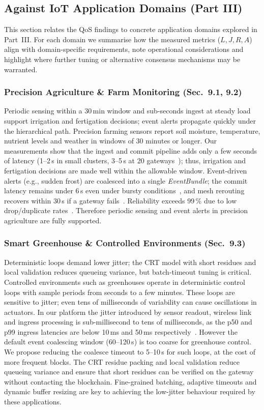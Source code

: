 \documentclass[12pt,onecolumn]{IEEEtran} %
\begin{document}
\subsection{Against IoT Application Domains (Part III)}
\label{subsec:domains}

This section relates the QoS findings to concrete application domains explored in Part~III. For each domain we summarise how the measured metrics ($L,J,R,A$) align with domain-specific requirements, note operational considerations and highlight where further tuning or alternative consensus mechanisms may be warranted.

\subsubsection{Precision Agriculture \& Farm Monitoring (Sec.~9.1, 9.2)}
Periodic sensing within a 30\,min window and sub-seconds ingest at steady load support irrigation and fertigation decisions; event alerts propagate quickly under the hierarchical path. Precision farming sensors report soil moisture, temperature, nutrient levels and weather in windows of 30 minutes or longer. Our measurements show that the ingest and commit pipeline adds only a few seconds of latency (1–2\,s in small clusters, 3–5\,s at 20 gateways~\cite{ref76853680998234}); thus, irrigation and fertigation decisions are made well within the allowable window. Event-driven alerts (e.g., sudden frost) are coalesced into a single \emph{EventBundle}; the commit latency remains under 6\,s even under bursty conditions~\cite{ref76853680998234}, and mesh rerouting recovers within 30\,s if a gateway fails~\cite{ref76853680998234}. Reliability exceeds 99\,\% due to low drop/duplicate rates~\cite{ref76853680998234}. Therefore periodic sensing and event alerts in precision agriculture are fully supported.

\subsubsection{Smart Greenhouse \& Controlled Environments (Sec.~9.3)}
Deterministic loops demand lower jitter; the CRT model with short residues and local validation reduces queueing variance, but batch-timeout tuning is critical. Controlled environments such as greenhouses operate in deterministic control loops with sample periods from seconds to a few minutes. These loops are sensitive to jitter; even tens of milliseconds of variability can cause oscillations in actuators. In our platform the jitter introduced by sensor readout, wireless link and ingress processing is sub-millisecond to tens of milliseconds, as the p50 and p99 ingress latencies are below 10\,ms and 50\,ms respectively~\cite{ref76853680998234}. However the default event coalescing window (60–120\,s) is too coarse for greenhouse control. We propose reducing the coalesce timeout to 5–10\,s for such loops, at the cost of more frequent blocks. The CRT residue packing and local validation reduce queueing variance and ensure that short residues can be verified on the gateway without contacting the blockchain. Fine-grained batching, adaptive timeouts and dynamic buffer resizing are key to achieving the low-jitter behaviour required by these applications.
\end{document}
